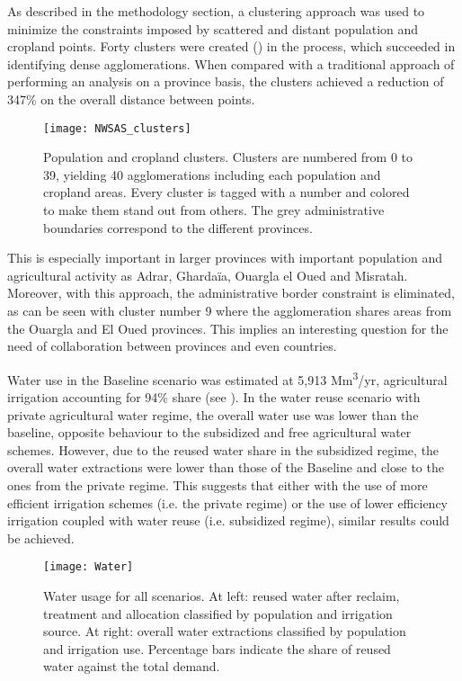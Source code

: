 As described in the methodology section, a clustering approach was used to minimize the constraints imposed by scattered and distant population and cropland points. Forty clusters were created () in the process, which succeeded in identifying dense agglomerations. When compared with a traditional approach of performing an analysis on a province basis, the clusters achieved a reduction of 347\% on the overall distance between points.

\begin{figure*}[!h]
    \centering
	\texttt{[image: NWSAS\_clusters]}
	\caption{Population and cropland clusters. Clusters are numbered from 0 to 39, yielding 40 agglomerations including each population and cropland areas. Every cluster is tagged with a number and colored to make them stand out from others. The grey administrative boundaries correspond to the different provinces.}
	\label{fig:clusters}
\end{figure*}

This is especially important in larger provinces with important population and agricultural activity as Adrar, Ghardaïa, Ouargla el Oued and Misratah. Moreover, with this approach, the administrative border constraint is eliminated, as can be seen with cluster number 9 where the agglomeration shares areas from the Ouargla and El Oued provinces. This implies an interesting question for the need of collaboration between provinces and even countries.

Water use in the Baseline scenario was estimated at 5,913 Mm\textsuperscript{3}/yr, agricultural irrigation accounting for 94\% share (see ). In the water reuse scenario with private agricultural water regime, the overall water use was lower than the baseline, opposite behaviour to the subsidized and free agricultural water schemes. However, due to the reused water share in the subsidized regime, the overall water extractions were lower than those of the Baseline and close to the ones from the private regime. This suggests that either with the use of more efficient irrigation schemes (i.e. the private regime) or the use of lower efficiency irrigation coupled with water reuse (i.e. subsidized regime), similar results could be achieved.

\begin{figure*}[!ht]
	\centering
	\texttt{[image: Water]}
	\caption{Water usage for all scenarios. At left: reused water after reclaim, treatment and allocation classified by population and irrigation source. At right: overall water extractions classified by population and irrigation use. Percentage bars indicate the share of reused water against the total demand.}
	\label{fig:water}
\end{figure*}

